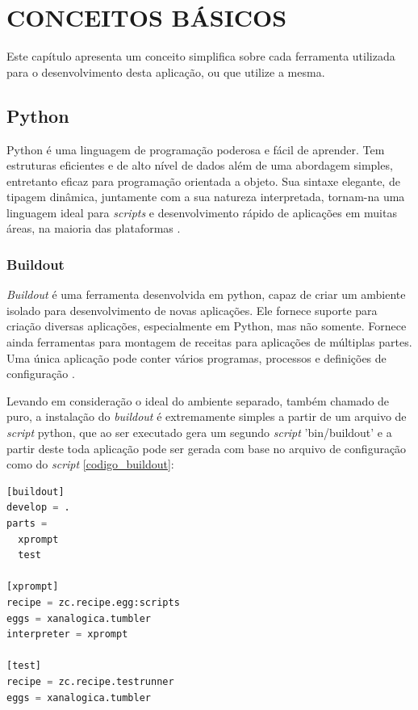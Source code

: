 \chapter{CONCEITOS BÁSICOS}

Este capítulo apresenta um conceito simplifica sobre cada ferramenta utilizada para o desenvolvimento desta aplicação, ou que utilize a mesma.

\section{Python}

Python é uma linguagem de programação poderosa e fácil de aprender. Tem estruturas eficientes e de alto nível de dados além de uma abordagem simples, entretanto eficaz para programação orientada a objeto. Sua sintaxe elegante, de tipagem dinâmica, juntamente com a sua natureza interpretada, tornam-na uma linguagem ideal para \textit{scripts} e desenvolvimento rápido de aplicações em muitas áreas, na maioria das plataformas \cite{GUIDO}.

\subsection{Buildout}
\label{buildout}

\textit{Buildout} é uma ferramenta desenvolvida em python, capaz de criar um ambiente isolado para desenvolvimento de novas aplicações. Ele fornece suporte para criação diversas aplicações, especialmente em Python, mas não somente. Fornece ainda ferramentas para montagem de receitas para aplicações de múltiplas partes. Uma única aplicação pode conter vários programas, processos e definições de configuração \cite{BRANDOM}.

Levando em consideração o ideal do ambiente separado, também chamado de puro, a instalação do \textit{buildout} é extremamente simples a partir de um arquivo de \textit{script} python, que ao ser executado gera um segundo \textit{script} 'bin/buildout' e a partir deste toda aplicação pode ser gerada com base no arquivo de configuração como do \textit{script} \ref{codigo_buildout}:

{\singlespace
\begin{lstlisting}[caption=Exemplo de um \textit{script buildout},language=python,label={codigo_buildout}]
[buildout]
develop = .
parts = 
  xprompt
  test

[xprompt]
recipe = zc.recipe.egg:scripts
eggs = xanalogica.tumbler
interpreter = xprompt

[test]
recipe = zc.recipe.testrunner
eggs = xanalogica.tumbler
\end{lstlisting}
}

